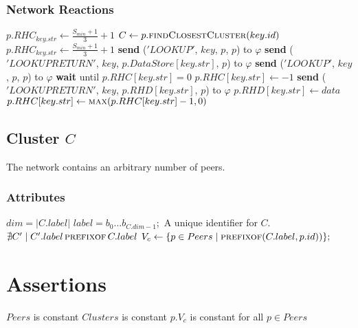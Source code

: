 \documentclass[]{article}
\begin{document}
				\subsubsection{Network Reactions}
					\begin{algorithmic}
							\State  $p.RHC_{key.str} \gets \frac{S_{min}+1}{3}+1$
							\State $C \gets p.\Call{findClosestCluster}{key.id}$
									\State  $p.RHC_{key.str} \gets \frac{S_{min}+1}{3}+1$
										\State \textbf{send} ($'LOOKUP'$, $key$, $p$, $p$) to  $\varphi$
									\EndFor
								\Else
										\State \textbf{send} ($'LOOKUPRETURN'$, $key$, $p.DataStore[key.str]$, $p$) to  $\varphi$
								\EndIf
							\Else
									\State \textbf{send} ($'LOOKUP'$, $key$, $p$, $p$) to  $\varphi$
								\EndFor
							\EndIf
							\State \textbf{wait} until $p.RHC[key.str] = 0$
							\State $p.RHC[key.str] \gets -1$
							\State \textbf{send} ($'LOOKUPRETURN'$, $key$, $p.RHD[key.str]$, $p$) to  $\varphi$
						\EndIf
								\State $p.RHD[key.str] \gets data$
								\State $p.RHC[key.str] \gets \Call{max}{p.RHC[key.str] - 1, 0}$
							\EndIf
						\EndIf
					\end{algorithmic}

		\subsection{Cluster $C$}
			The network contains an arbitrary number of peers.
			\subsubsection{Attributes}
				\begin{algorithmic}
					\State $dim = |C.label|$
					\State $label = b_0...b_{C.dim-1};$ A unique identifier for $C$. $\nexists C' \mid C'.label \, \Call{prefixof}{} \, C.label$
					\State $V_c \gets \{p \in  Peers \mid \Call{prefixof}{C.label, p.id)}\};$
				\end{algorithmic}
	
	\section{Assertions}
		\begin{algorithmic}
			\State $Peers$ is constant
			\State $Clusters$ is constant
			\State $p.V_c$ is constant for all $p \in Peers$
		\end{algorithmic}
\end{document}
